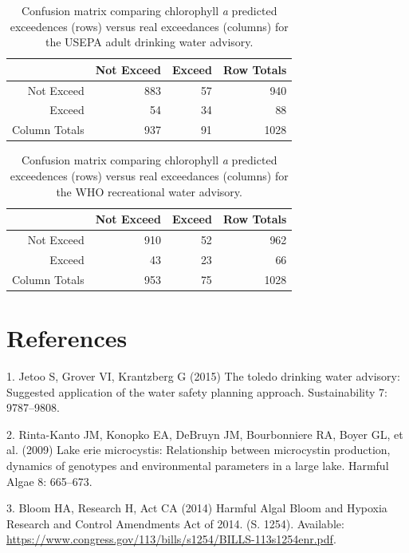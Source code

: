 \documentclass[10pt,a4paper,twocolumn]{article}
\begin{document}
\begin{table}[ht]
\caption{Confusion matrix comparing chlorophyll \textit{a} 
                     predicted exceedences (rows) versus real exceedances 
                     (columns) for the USEPA adult drinking water advisory.} 
\label{tab:adult_conmat_table}
\begin{tabular}{rrrr}
  \hline
 & Not Exceed & Exceed & Row Totals \\ 
  \hline
Not Exceed & 883 &  57 & 940 \\ 
  Exceed &  54 &  34 &  88 \\ 
  Column Totals & 937 &  91 & 1028 \\ 
   \hline
\end{tabular}
\end{table}

\begin{table}[ht]
\caption{Confusion matrix comparing chlorophyll \textit{a} 
                     predicted exceedences (rows) versus real exceedances 
                     (columns) for the WHO recreational water advisory.} 
\label{tab:who_rec_conmat_table}
\begin{tabular}{rrrr}
  \hline
 & Not Exceed & Exceed & Row Totals \\ 
  \hline
Not Exceed & 910 &  52 & 962 \\ 
  Exceed &  43 &  23 &  66 \\ 
  Column Totals & 953 &  75 & 1028 \\ 
   \hline
\end{tabular}
\end{table}

\twocolumn

\section*{References}\label{references}

1. Jetoo S, Grover VI, Krantzberg G (2015) The toledo drinking water
advisory: Suggested application of the water safety planning approach.
Sustainability 7: 9787--9808.

2. Rinta-Kanto JM, Konopko EA, DeBruyn JM, Bourbonniere RA, Boyer GL, et
al. (2009) Lake erie microcystis: Relationship between microcystin
production, dynamics of genotypes and environmental parameters in a
large lake. Harmful Algae 8: 665--673.

3. Bloom HA, Research H, Act CA (2014) Harmful Algal Bloom and Hypoxia
Research and Control Amendments Act of 2014. (S. 1254). Available:
\url{https://www.congress.gov/113/bills/s1254/BILLS-113s1254enr.pdf}.
\end{document}
